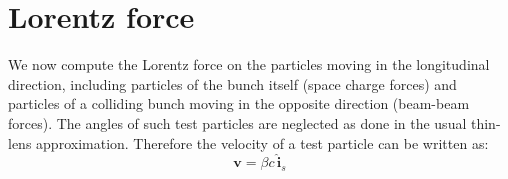 %
%
%
%
%
%
%
%

\section{Lorentz force}
We now compute the Lorentz force on the particles moving in the longitudinal direction, including particles of the bunch itself (space charge forces) and particles of a colliding bunch moving in the opposite direction (beam-beam forces).
The angles of such test particles are neglected as done in the usual thin-lens approximation. Therefore the velocity of a test particle can be written as:
\begin{equation}
\textbf{v} = \beta c\, \hat{\textbf{i}}_s
\end{equation}

